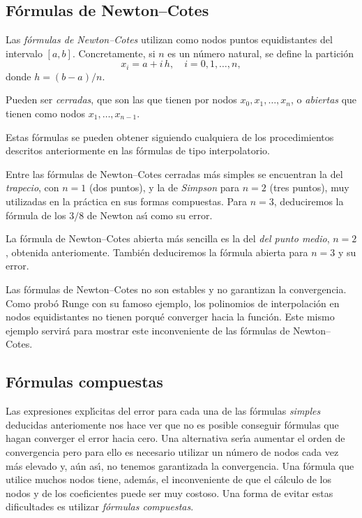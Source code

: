 \subsection*{F\'ormulas de Newton--Cotes}

Las {\it f\'ormulas de
Newton--Cotes\/} utilizan como nodos puntos equidistantes del intervalo $[a,b]$.
Concretamente, si $n$ es un n\'umero natural, se define la partici\'on 
$$x_i = a + i\, h,\quad i=0, 1, \ldots, n,$$
donde $h = (b-a)/n$.

Pueden ser {\it cerradas\/}, que son las que tienen por nodos $x_0,x_1,\ldots,x_n$, o {\it abiertas\/}
que tienen como nodos $x_1,\ldots,x_{n-1}$.

Estas f\'ormulas se pueden obtener siguiendo cualquiera de los procedimientos descritos anteriormente en las
f\'ormulas de tipo interpolatorio. 

Entre las f\'ormulas de Newton--Cotes cerradas m\'as simples
se encuentran la del {\it trapecio\/}, con $n=1$ (dos puntos), y la de {\it Simpson} para $n=2$ (tres puntos), muy utilizadas
en la pr\'actica en sus formas compuestas. Para $n=3$, deduciremos la f\'ormula de los $3/8$ de Newton as\'{\i} como su error.

La f\'ormula de Newton--Cotes abierta m\'as sencilla es la del {\it del punto medio\/}, $n=2$, obtenida anteriomente. Tambi\'en deduciremos la f\'ormula abierta para $n=3$ y su error.

\bigskip

Las f\'ormulas de Newton--Cotes no son estables y no garantizan la convergencia. Como prob\'o Runge con su famoso ejemplo, los polinomios de interpolaci\'on en nodos equidistantes no tienen porqu\'e converger hacia la funci\'on. Este mismo ejemplo servir\'a para mostrar este inconveniente de las f\'ormulas de Newton--Cotes. 


\subsection{F\'ormulas compuestas}

Las expresiones expl\'{\i}citas del error para cada una de las f\'ormulas {\it simples} deducidas anteriomente nos hace ver que no es posible conseguir f\'ormulas que hagan converger el error hacia cero. Una alternativa ser\'{\i}a aumentar
el orden de convergencia pero para ello es necesario utilizar un n\'umero de nodos cada vez m\'as
elevado y, a\'un as\'{\i}, no tenemos garantizada la convergencia. Una f\'ormula que utilice muchos nodos tiene, adem\'as, el inconveniente de
que el c\'alculo de los nodos y de los coeficientes puede ser muy costoso. Una forma
de evitar estas dificultades es utilizar {\it f\'ormulas compuestas}.


